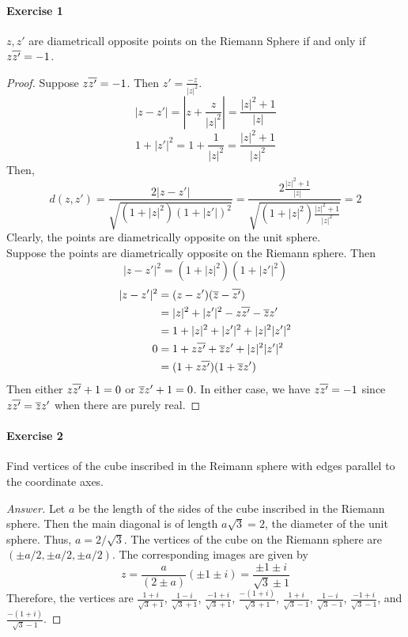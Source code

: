 \paragraph{Exercise 1}$z,z'$ are diametricall opposite points on the Riemann Sphere if and only if $z\overline{z'} = -1$.
	\begin{proof}
		Suppose $z\overline{z'} = -1$.
		Then $z' = \frac{-z}{|z|^2}$.
		\[ |z-z'| = \left| z + \frac{z}{|z|^2} \right| = \frac{|z|^2+1}{|z|} \]
		\[ 1+|z'|^2 = 1+ \frac{1}{|z|^2} = \frac{|z|^2+1}{|z|^2}  \]
		Then,
		\[ d(z,z') = \frac{2|z-z'|}{\sqrt{(1+|z|^2)(1+|{z'}|)^2}} = \frac{2\frac{|z|^2+1}{|z|}}{\sqrt{(1+|z|^2)\frac{|z|^2+1}{|z|^2}}} = 2 \]
		Clearly, the points are diametrically opposite on the unit sphere.\\

		Suppose the points are diametrically opposite on the Riemann sphere.
		Then
		\[ |{z-z'}|^2 = (1+|z|^2)(1+|{z'}|^2) \]
		\begin{align*}
			|{z-z'}| ^2
			& =  (z-z')(\overline{z}-\overline{z'}) \\
			& = |z|^2+|{z'}|^2 - z\overline{z'} - \overline{z}z'  \\
			& = 1+|z|^2+|{z'}|^2+|z|^2|{z'}|^2 \\
			0 & = 1+z\overline{z'}+\overline{z}z'+|z|^2|{z'}|^2 \\
			& = (1+z\overline{z'})(1+\overline{z}z')
		\end{align*}
		Then either $z\overline{z'}+1 = 0$ or $\overline{z}z'+1=0$.
		In either case, we have $z\overline{z'} = -1$ since $z\overline{z'} = \overline{z}z'$ when there are purely real.
	\end{proof}
\paragraph{Exercise 2} Find vertices of the cube inscribed in the Reimann sphere with edges parallel to the coordinate axes.
	\begin{proof}[Answer]
		Let $a$ be the length of the sides of the cube inscribed in the Riemann sphere.
		Then the main diagonal is of length $a\sqrt{3} = 2$, the diameter of the unit sphere.
		Thus, $a = 2/\sqrt{3}$.
		The vertices of the cube on the Riemann sphere are $(\pm a/2,\pm a/2,\pm a/2)$.
		The corresponding images are given by 
		\[ z = \frac{a}{(2 \pm a)}(\pm 1 \pm i) = \frac{\pm 1 \pm i}{\sqrt{3} \pm 1} \]
		Therefore, the vertices are $\frac{1+i}{\sqrt{3} + 1}$, $\frac{1-i}{\sqrt{3} + 1}$, $\frac{-1+i}{\sqrt{3} + 1}$, $\frac{-(1+i)}{\sqrt{3} + 1}$, $\frac{1+i}{\sqrt{3} - 1}$, $\frac{1-i}{\sqrt{3} - 1}$, $\frac{-1+i}{\sqrt{3} - 1}$, and $\frac{-(1+i)}{\sqrt{3} - 1}$.

	\end{proof}
